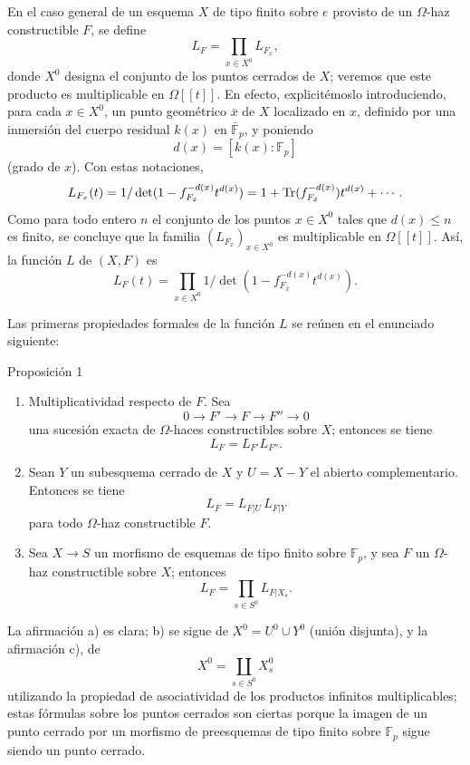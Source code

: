En el caso general de un esquema $X$ de tipo finito sobre $e$ provisto de un $\Omega$-haz constructible $F$, se define
\[
L_F=\prod_{x\in X^0}L_{F_x},
\]
donde $X^0$ designa el conjunto de los puntos cerrados de $X$; veremos que este producto es multiplicable en $\Omega[[t]]$. En efecto, explicitémoslo introduciendo, para cada $x\in X^0$, un punto geométrico $\bar x$ de $X$ localizado en $x$, definido por una inmersión del cuerpo residual $k(x)$ en $\bar{\mathbb F}_p$, y poniendo
\[
d(x)=[k(x):\mathbb F_p]
\]
(grado de $x$). Con estas notaciones,
\[
L_{F_x}(t)=1/\det(1-f_{F_{\bar x}}^{-d(x)}t^{d(x)})
 =1+\operatorname{Tr}(f_{F_{\bar x}}^{-d(x)})t^{d(x)}+\cdots .
\]
Como para todo entero $n$ el conjunto de los puntos $x\in X^0$ tales que $d(x)\le n$ es finito, se concluye que la familia $(L_{F_x})_{x\in X^0}$ es multiplicable en $\Omega[[t]]$. Así, la función $L$ de $(X,F)$ es
\[
L_F(t)=\prod_{x\in X^0}1/\det(1-f_{F_{\bar x}}^{-d(x)}t^{d(x)}).
\]

Las primeras propiedades formales de la función $L$ se reúnen en el enunciado siguiente:

\begin{statement}{Proposición 1}
\begin{enumerate}[label=\alph*)]
\item Multiplicatividad respecto de $F$. Sea
\[
0\longrightarrow F'\longrightarrow F\longrightarrow F''\longrightarrow0
\]
una sucesión exacta de $\Omega$-haces constructibles sobre $X$; entonces se tiene
\[
L_F=L_{F'}L_{F''}.
\]
\item Sean $Y$ un subesquema cerrado de $X$ y $U=X-Y$ el abierto complementario. Entonces se tiene
\[
L_F=L_{F|U}\,L_{F|Y}
\]
para todo $\Omega$-haz constructible $F$.
\item Sea $X\to S$ un morfismo de esquemas de tipo finito sobre $\mathbb F_p$, y sea $F$ un $\Omega$-haz constructible sobre $X$; entonces
\[
L_F=\prod_{s\in S^0}L_{F|X_s}.
\]
\end{enumerate}
\end{statement}

La afirmación a) es clara; b) se sigue de $X^0=U^0\cup Y^0$ (unión disjunta), y la afirmación c), de
\[
X^0=\coprod_{s\in S^0}X_s^0
\]
utilizando la propiedad de asociatividad de los productos infinitos multiplicables; estas fórmulas sobre los puntos cerrados son ciertas porque la imagen de un punto cerrado por un morfismo de preesquemas de tipo finito sobre $\mathbb F_p$ sigue siendo un punto cerrado.
